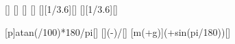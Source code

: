 [\mpss]
[\kg]
[\percent]
[\s]
[\kmph][1/3.6][\mps]
[\kmph][1/3.6][\mps]

[\arctan p]{atan(\stgX/100)*180/pi}[\degree]
[]{(\vEnX-\vAnX)/\tMoX}[\mpss]
[m\left(+g\sin\alpha\right)]{\mMoX*(\aMoX+\gEX*sin(\wiX*pi/180))}[\newton]
